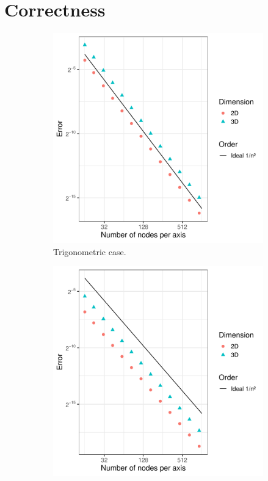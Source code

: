 \section{Correctness}
\begin{figure}
    \centering
    \begin{subfigure}{0.49\textwidth}
        \centering
        \includegraphics[width=\linewidth]{figures/experiments/convergence_trig.pdf}
        \caption{Trigonometric case.}
    \end{subfigure}
    \begin{subfigure}{0.49\textwidth}
        \centering
        \includegraphics[width=\linewidth]{figures/experiments/convergence_poly.pdf}

\end{subfigure}
\end{figure}
